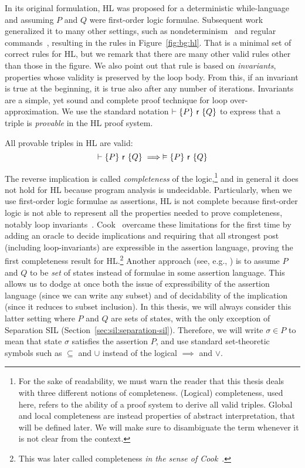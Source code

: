 In its original formulation, HL was proposed for a deterministic while-language and assuming $P$ and $Q$ were first-order logic formulae.
Subsequent work generalized it to many other settings, such as nondeterminism~\cite{Apt84} and regular commands~\cite{MOH21}, resulting in the rules in Figure~\ref{fig:bg:hl}.
That is a minimal set of correct rules for HL, but we remark that there are many other valid rules other than those in the figure. We also point out that rule  is based on \emph{invariants}, properties whose validity is preserved by the loop body. From this, if an invariant is true at the beginning, it is true also after any number of iterations. Invariants are a simple, yet sound and complete proof technique for loop over-approximation.
We use the standard notation $\vdash \{P\}~\mathsf{r}~\{Q\}$ to express that a triple is \emph{provable} in the HL proof system.

\begin{theorem}
	All provable triples in HL are valid:
	\[
	\vdash \{P\}~\mathsf{r}~\{Q\} \implies \vDash \{P\}~\mathsf{r}~\{Q\}
	\]
\end{theorem}

The reverse implication is called \emph{completeness} of the logic,\footnote{For the sake of readability, we must warn the reader that this thesis deals with three different notions of completeness. (Logical) completeness, used here, refers to the ability of a proof system to derive all valid triples. Global and local completeness are instead properties of abstract interpretation, that will be defined later. We will make sure to disambiguate the term whenever it is not clear from the context.} and in general it does not hold for HL because program analysis is undecidable. Particularly, when we use first-order logic formulae as assertions, HL is not complete because first-order logic is not able to represent all the properties needed to prove completeness, notably loop invariants~\cite[§2.7]{Apt81}.
Cook~\cite{Cook78} overcame these limitations for the first time by adding an oracle to decide implications and requiring that all strongest post (including loop-invariants) are expressible in the assertion language, proving the first completeness result for HL.\footnote{This was later called completeness \emph{in the sense of Cook}~\cite[§2.8]{Apt81}.}
Another approach (see, e.g., \cite{CCLB12,OHearn20}) is to assume $P$ and $Q$ to be \emph{set} of states instead of formulae in some assertion language. This allows us to dodge at once both the issue of expressibility of the assertion language (since we can write any subset) and of decidability of the implication (since it reduces to subset inclusion).
In this thesis, we will always consider this latter setting where $P$ and $Q$ are sets of states, with the only exception of Separation SIL (Section~\ref{sec:sil:separation-sil}). Therefore, we will write $\sigma \in P$ to mean that state $\sigma$ satisfies the assertion $P$, and use standard set-theoretic symbols such as $\subseteq$ and $\cup$ instead of the logical $\implies$ and $\lor$.


